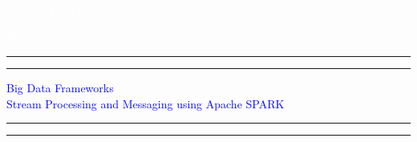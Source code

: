 \documentclass[12pt,a4paper]{article}
\begin{document}

\begin{titlepage} %
	
	\vspace{4\baselineskip} %

	\centering %

	\textcolor{White}{ADSA-4A-IBO\\} %
	
	\vspace{0.5\baselineskip} %
	\textcolor{White}{W[3]\\}	
	\vspace{2\baselineskip} %
	
	
	\rule{\textwidth}{1.6pt}\vspace*{-\baselineskip}\vspace*{2pt} %
	\rule{\textwidth}{0.4pt} %
	
	\vspace{0.75\baselineskip} %
	
	\textcolor{Blue}{\Large Big Data Frameworks} %
	\vspace{0.75\baselineskip}
	\textcolor{Blue}{\large \\Stream Processing and Messaging using Apache SPARK} %
	
	\vspace{0.75\baselineskip} %
	
	\rule{\textwidth}{0.4pt}\vspace*{-\baselineskip}\vspace{3.2pt} %
	\rule{\textwidth}{1.6pt} %
	
	\vspace{2\baselineskip} %
	
	

\end{titlepage}
\end{document}
